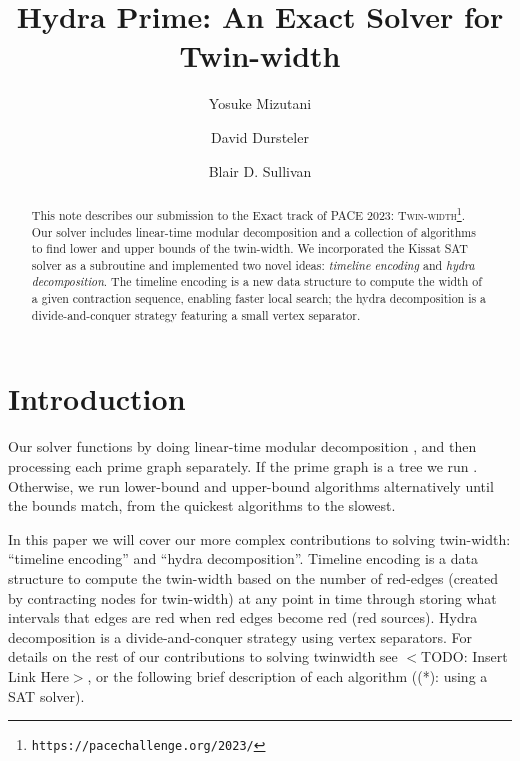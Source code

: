 \documentclass[a4paper,UKenglish,cleveref, autoref, thm-restate]{lipics-v2021}
\title{Hydra Prime: An Exact Solver for Twin-width} %
\author{Yosuke Mizutani}{\universityOfUtah}{yos@cs.utah.edu}{https://orcid.org/0000-0002-9847-4890}{}
\author{David Dursteler}{\universityOfUtah}{u1161522@utah.edu}{https://orcid.org/0009-0000-6471-1504}{}
\author{Blair D. Sullivan}{\universityOfUtah}{sullivan@cs.utah.edu}{https://orcid.org/0000-0001-7720-6208}{}
\begin{document}
\maketitle

\begin{abstract}
This note describes our submission to the Exact track of PACE 2023:
 \textsc{Twin-width}\footnote{%
\texttt{https://pacechallenge.org/2023/}}.
%
Our solver includes linear-time modular decomposition and
a collection of algorithms to find lower and upper bounds of the twin-width.
%
We incorporated the \textsf{Kissat} SAT solver \cite{biere_gimsatul_2022} as a subroutine
and implemented two novel ideas:
\emph{timeline encoding} and \emph{hydra decomposition}.
%
The timeline encoding is a new data structure to compute the width of a given contraction
sequence, enabling faster local search;
the hydra decomposition is a divide-and-conquer strategy featuring a small vertex separator.
\end{abstract}

\section{Introduction}
Our solver functions by doing linear-time modular decomposition \cite{tedder_simple_2008}, and then processing each prime graph separately.
%
If the prime graph is a tree
we run \primetreesolver.
%
Otherwise, we run lower-bound and upper-bound algorithms alternatively
until the bounds match, from the quickest algorithms to the slowest. 


In this paper we will cover our more complex contributions to solving twin-width: ``timeline encoding'' and ``hydra decomposition''.
%
Timeline encoding is a data structure to compute the twin-width based on the number of red-edges (created by contracting nodes for twin-width) at any point in time through storing what intervals that edges are red when red edges become red (red sources).
%
Hydra decomposition is a divide-and-conquer strategy using vertex separators.
%
For details on the rest of our contributions to solving twinwidth see $<$TODO: Insert Link Here$>$, or the following brief description of each algorithm ((*): using a SAT solver).
\end{document}
